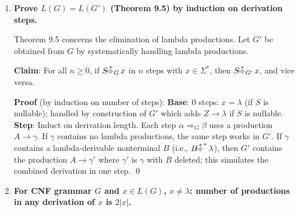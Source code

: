 \begin{enumerate}[{9.}1. ]
\begin{enumerate}
\item \textbf{Rightmost derivation} (always expand rightmost nonterminal):
\begin{align*}
R &\Rightarrow \pmb{(}R\pmb{\cup}R\pmb{)} \\
&\Rightarrow \pmb{(}R\pmb{\cup}\pmb{(}R\pmb{\cdot}R\pmb{)}^{\pmb{*}}\pmb{)} \\
&\Rightarrow \pmb{(}R\pmb{\cup(}R\pmb{\cdot}\pmb{d}\pmb{)}^{\pmb{*}}\pmb{)} \\
&\Rightarrow \pmb{(}R\pmb{\cup(}\pmb{c}\pmb{\cdot d)}^{\pmb{*}}\pmb{)} \\
&\Rightarrow \pmb{(}\pmb{(}R\pmb{\cdot}R\pmb{)}\pmb{\cup(c\cdot d)}^{\pmb{*}}\pmb{)} \\
&\Rightarrow \pmb{((}R\pmb{\cdot}\pmb{b}\pmb{)\cup(c\cdot d)}^{\pmb{*}}\pmb{)} \\
&\Rightarrow \pmb{((}R^{\pmb{*}}\pmb{\cdot b)\cup(c\cdot d)}^{\pmb{*}}\pmb{)} \\
&\Rightarrow \pmb{((a^*\cdot b)\cup(c\cdot d)}^{\pmb{*}}\pmb{)}
\end{align*}
\end{enumerate}

\item \textbf{Prove $L(G) = L(G')$ (Theorem 9.5) by induction on derivation steps.}

Theorem 9.5 concerns the elimination of lambda productions. Let $G'$ be obtained from $G$ by systematically handling lambda productions.

\textbf{Claim}: For all $n \geq 0$, if $S \DRightarrow_G x$ in $n$ steps with $x \in \Sigma^*$, then $S \DRightarrow_{G'} x$, and vice versa.

\textbf{Proof} (by induction on number of steps):
\textbf{Base}: 0 steps: $x = \lambda$ (if $S$ is nullable); handled by construction of $G'$ which adds $Z \to \lambda$ if $S$ is nullable.
\textbf{Step}: Induct on derivation length. Each step $\alpha \Rightarrow_G \beta$ uses a production $A \to \gamma$. If $\gamma$ contains no lambda productions, the same step works in $G'$. If $\gamma$ contains a lambda-derivable nonterminal $B$ (i.e., $B \DRightarrow^* \lambda$), then $G'$ contains the production $A \to \gamma'$ where $\gamma'$ is $\gamma$ with $B$ deleted; this simulates the combined derivation in one step. \qed

\item \textbf{For CNF grammar $G$ and $x \in L(G)$, $x \neq \lambda$: number of productions in any derivation of $x$ is $2|x|$.}


\end{enumerate}
